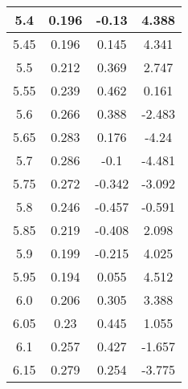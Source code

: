\begin{multicols}{2}
\begin{longtable}{|c|c|c|c|}
    \hline
    5.4      & 0.196        & -0.13                                  & 4.388                                        \\
    \hline
    5.45     & 0.196        & 0.145                                  & 4.341                                        \\
    \hline
    5.5      & 0.212        & 0.369                                  & 2.747                                        \\
    \hline
    5.55     & 0.239        & 0.462                                  & 0.161                                        \\
    \hline
    5.6      & 0.266        & 0.388                                  & -2.483                                       \\
    \hline
    5.65     & 0.283        & 0.176                                  & -4.24                                        \\
    \hline
    5.7      & 0.286        & -0.1                                   & -4.481                                       \\
    \hline
    5.75     & 0.272        & -0.342                                 & -3.092                                       \\
    \hline
    5.8      & 0.246        & -0.457                                 & -0.591                                       \\
    \hline
    5.85     & 0.219        & -0.408                                 & 2.098                                        \\
    \hline
    5.9      & 0.199        & -0.215                                 & 4.025                                        \\
    \hline
    5.95     & 0.194        & 0.055                                  & 4.512                                        \\
    \hline
    6.0      & 0.206        & 0.305                                  & 3.388                                        \\
    \hline
    6.05     & 0.23         & 0.445                                  & 1.055                                        \\
    \hline
    6.1      & 0.257        & 0.427                                  & -1.657                                       \\
    \hline
    6.15     & 0.279        & 0.254                                  & -3.775                                       \\

\end{longtable}
\end{multicols}
